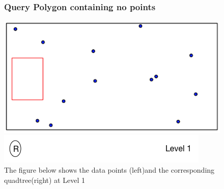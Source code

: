 \documentclass{article}
\begin{document}
\begin{figure}[ht]
\subsubsection{Query Polygon containing no points}

\caption{The figure below shows the data points (left)and the corresponding quadtree(right) at Level 1}
  \centering
  \begin{minipage}[b]{0.35\textwidth}
    \includegraphics[width=\textwidth]{NoPointQuad1}  
  \end{minipage}
  \hfill
  \begin{minipage}[b]{0.6\textwidth}
    \includegraphics[width=\textwidth]{1_1Quad_1_tree}
  \end{minipage}
\end{figure}
\end{document}

